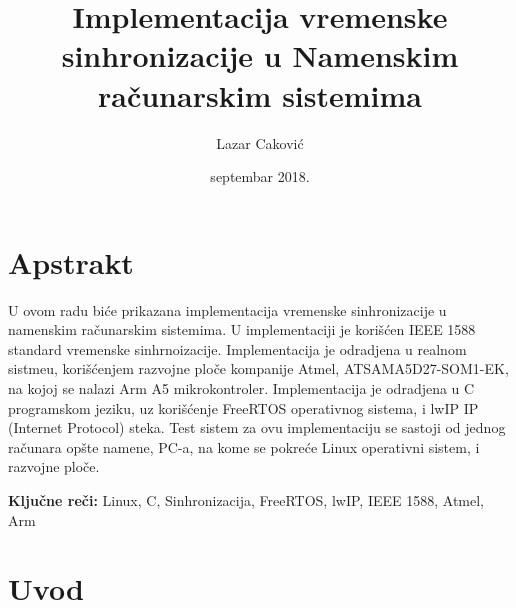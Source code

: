 \documentclass[a4paper,12pt, master]{etf}
\title{Implementacija vremenske sinhronizacije u Namenskim ra\v{c}unarskim sistemima}
\author{Lazar Caković}
\date{septembar 2018.}
\begin{document}
	\maketitle

	\tableofcontents

	\listoffigures

	\newpage

	\chapter{Apstrakt}

	U ovom radu bi\'{c}e prikazana implementacija vremenske sinhronizacije u
	namenskim ra\v{c}unarskim sistemima. U implementaciji je kori\v{s}\'{c}en
	IEEE 1588 standard vremenske sinhrnoizacije. Implementacija je odradjena u
	realnom sistmeu, kori\v{s}\'{c}enjem razvojne plo\v{c}e kompanije Atmel,
	ATSAMA5D27-SOM1-EK, na kojoj se nalazi Arm A5 mikrokontroler.
	Implementacija je odradjena u C programskom jeziku, uz kori\v{s}\'{c}enje
	FreeRTOS operativnog sistema, i lwIP IP (Internet Protocol) steka. Test
	sistem za ovu implementaciju se sastoji od jednog ra\v{c}unara op\v{s}te
	namene, PC-a, na kome se pokre\'{c}e Linux operativni sistem, i razvojne
	plo\v{c}e.

	\vspace{2cm}

	\textbf{Klju\v{c}ne re\v{c}i:}
	Linux, C, Sinhronizacija, FreeRTOS, lwIP, IEEE 1588, Atmel, Arm

	\newpage

	\chapter{Uvod}
\end{document}
